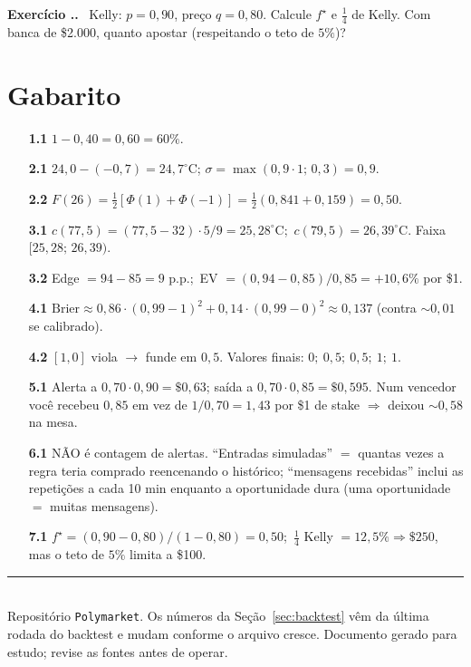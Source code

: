 \documentclass[11pt,a4paper]{article}
\newcounter{exc}[section]
\renewcommand{\theexc}{\thesection.\arabic{exc}}
\newenvironment{exercicio}{\refstepcounter{exc}\medskip\noindent
  \textbf{\color{azul}Exercício \theexc.}\ }{\medskip}
\begin{document}
\begin{exercicio}
Kelly: $p=0{,}90$, preço $q=0{,}80$. Calcule $f^\star$ e $\tfrac14$ de Kelly.
Com banca de \$2.000, quanto apostar (respeitando o teto de $5\%$)?
\end{exercicio}

\appendix
\section{Gabarito}
\begin{enumerate}
  \item[\textbf{1.1}] $1-0{,}40=0{,}60=60\%$.
  \item[\textbf{2.1}] $24{,}0-(-0{,}7)=24{,}7^\circ$C; $\sigma=\max(0{,}9\cdot1;\,0{,}3)=0{,}9$.
  \item[\textbf{2.2}] $F(26)=\tfrac12[\Phi(1)+\Phi(-1)]=\tfrac12(0{,}841+0{,}159)=0{,}50$.
  \item[\textbf{3.1}] $c(77{,}5)=(77{,}5-32)\cdot5/9=25{,}28^\circ$C;\ $c(79{,}5)=26{,}39^\circ$C. Faixa $[25{,}28;\,26{,}39)$.
  \item[\textbf{3.2}] Edge $=94-85=9$ p.p.;\ EV $=(0{,}94-0{,}85)/0{,}85=+10{,}6\%$ por \$1.
  \item[\textbf{4.1}] $\text{Brier}\approx 0{,}86\cdot(0{,}99-1)^2 + 0{,}14\cdot(0{,}99-0)^2 \approx 0{,}137$ (contra $\sim0{,}01$ se calibrado).
  \item[\textbf{4.2}] $[1,0]$ viola $\to$ funde em $0{,}5$. Valores finais: $0;\ 0{,}5;\ 0{,}5;\ 1;\ 1$.
  \item[\textbf{5.1}] Alerta a $0{,}70\cdot0{,}90=\$0{,}63$; saída a $0{,}70\cdot0{,}85=\$0{,}595$. Num vencedor você recebeu $0{,}85$ em vez de $1/0{,}70=1{,}43$ por \$1 de stake $\Rightarrow$ deixou $\sim0{,}58$ na mesa.
  \item[\textbf{6.1}] NÃO é contagem de alertas. ``Entradas simuladas'' $=$ quantas vezes a regra teria comprado reencenando o histórico; ``mensagens recebidas'' inclui as repetições a cada 10 min enquanto a oportunidade dura (uma oportunidade $=$ muitas mensagens).
  \item[\textbf{7.1}] $f^\star=(0{,}90-0{,}80)/(1-0{,}80)=0{,}50$;\ $\tfrac14$ Kelly $=12{,}5\%\Rightarrow\$250$, mas o teto de $5\%$ limita a \$100.
\end{enumerate}

\vfill
\noindent\rule{\linewidth}{0.4pt}\\
{\small Repositório \texttt{Polymarket}. Os números da
Seção~\ref{sec:backtest} vêm da última rodada do backtest e mudam conforme o
arquivo cresce. Documento gerado para estudo; revise as fontes antes de operar.}
\end{document}
